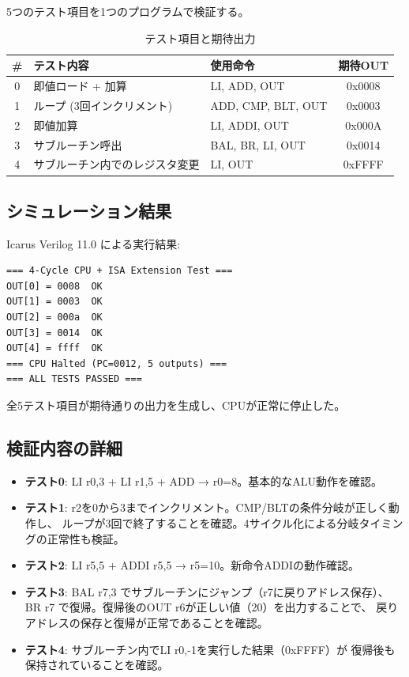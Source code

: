 \documentclass[a4paper,11pt]{ltjsarticle}
\begin{document}
5つのテスト項目を1つのプログラムで検証する。

\begin{table}[h]
\centering
\caption{テスト項目と期待出力}
\begin{tabular}{cllc}
\toprule
\# & テスト内容 & 使用命令 & 期待OUT \\
\midrule
0 & 即値ロード + 加算 & LI, ADD, OUT & 0x0008 \\
1 & ループ (3回インクリメント) & ADD, CMP, BLT, OUT & 0x0003 \\
2 & 即値加算 & LI, ADDI, OUT & 0x000A \\
3 & サブルーチン呼出 & BAL, BR, LI, OUT & 0x0014 \\
4 & サブルーチン内でのレジスタ変更 & LI, OUT & 0xFFFF \\
\bottomrule
\end{tabular}
\end{table}

\subsection{シミュレーション結果}

Icarus Verilog 11.0 による実行結果:

\begin{lstlisting}[language={},frame=single,caption={シミュレーション出力}]
=== 4-Cycle CPU + ISA Extension Test ===
OUT[0] = 0008  OK
OUT[1] = 0003  OK
OUT[2] = 000a  OK
OUT[3] = 0014  OK
OUT[4] = ffff  OK
=== CPU Halted (PC=0012, 5 outputs) ===
=== ALL TESTS PASSED ===
\end{lstlisting}

全5テスト項目が期待通りの出力を生成し、CPUが正常に停止した。

\subsection{検証内容の詳細}

\begin{itemize}
\item \textbf{テスト0}: LI r0,3 + LI r1,5 + ADD → r0=8。基本的なALU動作を確認。
\item \textbf{テスト1}: r2を0から3までインクリメント。CMP/BLTの条件分岐が正しく動作し、
  ループが3回で終了することを確認。4サイクル化による分岐タイミングの正常性も検証。
\item \textbf{テスト2}: LI r5,5 + ADDI r5,5 → r5=10。新命令ADDIの動作確認。
\item \textbf{テスト3}: BAL r7,3 でサブルーチンにジャンプ（r7に戻りアドレス保存）、
  BR r7 で復帰。復帰後のOUT r6が正しい値（20）を出力することで、
  戻りアドレスの保存と復帰が正常であることを確認。
\item \textbf{テスト4}: サブルーチン内でLI r0,-1を実行した結果（0xFFFF）が
  復帰後も保持されていることを確認。
\end{itemize}
\end{document}
